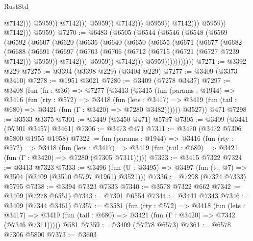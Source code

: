 \begin{lexlean}{RustStd}
\begin{coremodule}
                                                    @7142)))
                                              @5959))
                                          @7142)))
                                    @5959))
                                @7142)))
                          @5959))
                      @7142)))
                @5959))
            @7142)))
      @5959)
@7270 := @6483
    (@6505
      (@6544
        (@6546
          (@6548
            (@6569
              (@6592
                (@6607
                  (@6620
                    (@6636
                      (@6640
                        (@6650
                          (@6655
                            (@6671
                              (@6677
                                (@6682
                                  (@6688
                                    (@6691
                                      (@6697
                                        (@6703
                                          (@6706 (@6712 (@6715 (@6721 (@6727 @7239 @7142))) @5959))
                                          @7142)))
                                    @5959))
                                @7142)))
                          @5959)))))))))))
@7271 := @3392 @229
@7275 := @3394 (@3398 @229) (@3404 @229)
@7277 := @3409 (@3373 @3410)
@7278 := @1951 @3021
@7280 := @3409 (@7278 @3437)
@7297 := @3408
    (fun (fn : @36) =>
    @7277
      (@3413
        (@3415
          (fun (params : @1944) =>
          @3416
            (fun (rty : @572) =>
            @3418
              (fun (lets : @3417) =>
              @3419 (fun (tail : @680) => @3421 (fun (Γ : @3420) => @7280 @3482))))))
        @3527))
    @471
@7298 := @3533 @3375
@7301 := @3449 (@3450 @471) @5797
@7305 := @3409 (@3441 (@7301 @3457) @3461)
@7306 := @3473 @471
@7311 := @3470 (@3472 @7306 @5800 @1955 @1958)
@7322 := fun (params : @1944) =>
  @3416
    (fun (rty : @572) =>
    @3418
      (fun (lets : @3417) =>
      @3419 (fun (tail : @680) => @3421 (fun (Γ : @3420) => @7280 (@7305 @7311)))))
@7323 := @3415 @7322
@7324 := @3413 @7323
@7333 := @3496 (fun (U : @3495) => @3497 (fun (t : @7) => @3504 (@3409 (@3510 @5797 @1961) @3521)))
@7336 := @7298 (@7324 @7333) @5795
@7338 := @3394 @7323 @7333
@7340 := @3578 @7322 @662
@7342 := @3409 (@7278 @6551)
@7343 := @7301 @6554
@7344 := @3441 @7343
@7346 := @3409 (@7344 @3461)
@7357 := @3581
    (fun (rty : @572) =>
    @3418
      (fun (lets : @3417) =>
      @3419 (fun (tail : @680) => @3421 (fun (Γ : @3420) => @7342 (@7346 @7311)))))
    @581
@7359 := @3409 (@7278 @6573)
@7361 := @6578 @7306 @5800
@7373 := @3603

\end{coremodule}
\end{lexlean}
